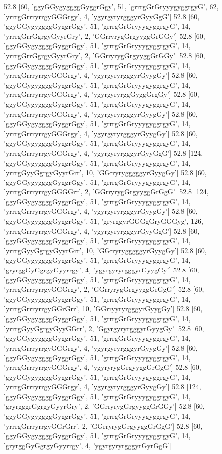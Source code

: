 52.8 [60, 'ggyGGygyggggGyggrGgy', 51, 'grrrgGrGryyygyggrgyG', 62, 'yrrrgGrrryrrgyGGGrgy', 4, 'ygyrgyryrgggyrGyyGgG']
52.8 [60, 'ggyGGygyggggGyggrGgy', 51, 'grrrgGrGryyygyggrgyG', 14, 'yrrrgGrrGgrgyGyyrGry', 2, 'GGrryrygGrgyyggGrGGy']
52.8 [60, 'ggyGGygyggggGyggrGgy', 51, 'grrrgGrGryyygyggrgyG', 14, 'yrrrgGrrGgrgyGyyrGry', 2, 'GGrryrygGrgyyggGrGGy']
52.8 [60, 'ggyGGygyggggGyggrGgy', 51, 'grrrgGrGryyygyggrgyG', 14, 'yrrrgGrrryrrgyGGGrgy', 4, 'ygyrgyryrgggyrGyygGy']
52.8 [60, 'ggyGGygyggggGyggrGgy', 51, 'grrrgGrGryyygyggrgyG', 14, 'yrrrgGrrryrrgyGGGrgy', 4, 'ygyrgyryrggGyggGrgGy']
52.8 [60, 'ggyGGygyggggGyggrGgy', 51, 'grrrgGrGryyygyggrgyG', 14, 'yrrrgGrrryrrgyGGGrgy', 4, 'ygyrgyryrgggyrGyygGy']
52.8 [60, 'ggyGGygyggggGyggrGgy', 51, 'grrrgGrGryyygyggrgyG', 14, 'yrrrgGrrryrrgyGGGrgy', 4, 'ygyrgyryrgggyrGyygGy']
52.8 [60, 'ggyGGygyggggGyggrGgy', 51, 'grrrgGrGryyygyggrgyG', 14, 'yrrrgGrrryrrgyGGGrgy', 4, 'ygyrgyryrgggyrGyyGgG']
52.8 [124, 'ggyGGygyggggGyggrGgy', 51, 'grrrgGrGryyygyggrgyG', 14, 'yrrrgGyyGgrgyGyyrGrr', 10, 'GGrryrygggggyrGyygGy']
52.8 [60, 'ggyGGygyggggGyggrGgy', 51, 'grrrgGrGryyygyggrgyG', 14, 'yrrrgGrrryrrgyGGGGrr', 2, 'GGrryrygGrgyyggGrGgG']
52.8 [124, 'ggyGGygyggggGyggrGgy', 51, 'grrrgGrGryyygyggrgyG', 14, 'yrrrgGrrryrrgyGGGrgy', 4, 'ygyrgyryrgggyrGyygGy']
52.8 [60, 'ggyGGygyggggGyggrGgy', 51, 'gryrggyrGGGgGryGGGyg', 126, 'yrrrgGrrryrrgyGGGrgy', 4, 'ygyrgyryrgggyrGyyGgG']
52.8 [60, 'ggyGGygyggggGyggrGgy', 51, 'grrrgGrGryyygyggrgyG', 14, 'yrrrgGyyGgrgyGyyrGrr', 10, 'GGrryrygggggyrGyygGy']
52.8 [60, 'ggyGGygyggggGyggrGgy', 51, 'grrrgGrGryyygyggrgyG', 14, 'gryrggGyGgrgyGyyrrgy', 4, 'ygyrgyryrgggyrGyygGy']
52.8 [60, 'ggyGGygyggggGyggrGgy', 51, 'grrrgGrGryyygyggrgyG', 14, 'yrrrgGrrryrrgyGGGrgy', 2, 'GGrryrygGrgyyggGrGgG']
52.8 [60, 'ggyGGygyggggGyggrGgy', 51, 'grrrgGrGryyygyggrgyG', 14, 'yrrrgGrrryrrgyGGrGrr', 10, 'GGrryyryrgggyrGyygGy']
52.8 [60, 'ggyGGygyggggGyggrGgy', 51, 'grrrgGrGryyygyggrgyG', 14, 'yrrrgGyyGgrgyGyyGGrr', 2, 'GgyrgyryrgggyrGyygGy']
52.8 [60, 'ggyGGygyggggGyggrGgy', 51, 'grrrgGrGryyygyggrgyG', 14, 'yrrrgGrrryrrgyGGGrgy', 4, 'ygyrgyryrgggyrGyygGy']
52.8 [60, 'ggyGGygyggggGyggrGgy', 51, 'grrrgGrGryyygyggrgyG', 14, 'yrrrgGrrryrrgyGGGrgy', 4, 'ygyryrygGrgyyggGrGgG']
52.8 [60, 'ggyGGygyggggGyggrGgy', 51, 'grrrgGrGryyygyggrgyG', 14, 'yrrrgGrrryrrgyGGGrgy', 4, 'ygyrgyryrgggyrGyygGy']
52.8 [124, 'ggyGGygyggggGyggrGgy', 51, 'grrrgGrGryyygyggrgyG', 14, 'gryrgggrGgrgyGyyrGry', 2, 'GGrryrygGrgyyggGrGGy']
52.8 [60, 'ggyGGygyggggGyggrGgy', 51, 'grrrgGrGryyygyggrgyG', 14, 'yrrrgGrrryrrgyGGrGrr', 2, 'GGrryrygGrgyyggGrGgG']
52.8 [60, 'ggyGGygyggggGyggrGgy', 51, 'grrrgGrGryyygyggrgyG', 14, 'gryrggGyGgrgyGyyrrgy', 4, 'ygyrgyryrgggyrGyrGgG']
